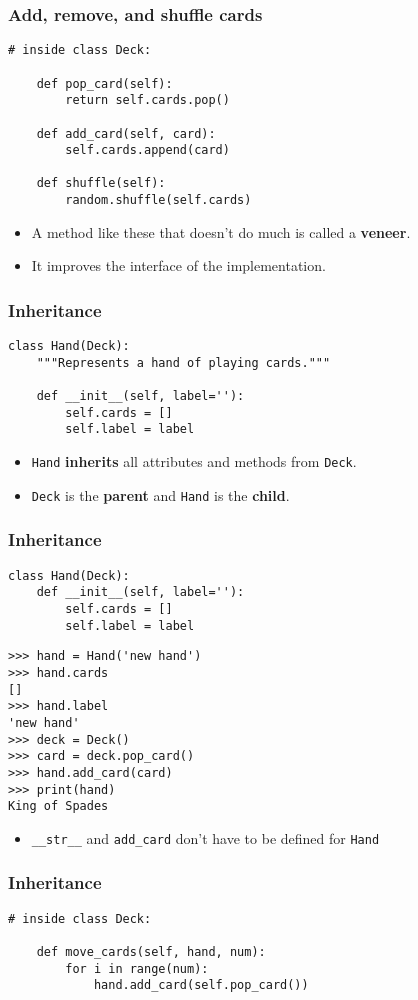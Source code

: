 \documentclass{beamer}
\newcommand{\bi}{\begin{itemize}}
\newcommand{\li}{\item}
\newcommand{\ei}{\end{itemize}}
\newcommand{\bfr}[1]{\begin{frame}[fragile]\frametitle{{ #1 }}}
\begin{document}
\bfr{Add, remove, and shuffle cards}
\begin{lstlisting}
# inside class Deck:

    def pop_card(self):
        return self.cards.pop()

    def add_card(self, card):
        self.cards.append(card)       
     
    def shuffle(self):
        random.shuffle(self.cards)
\end{lstlisting}

\bi
\li
A method like these that doesn't do much is called a {\bf veneer}.
\li
It improves the interface of the implementation.
\ei

\end{frame}

\bfr{Inheritance}
\begin{lstlisting}
class Hand(Deck):
    """Represents a hand of playing cards."""

    def __init__(self, label=''):
        self.cards = []
        self.label = label
\end{lstlisting}

\bi
\li
\lstinline{Hand} {\bf inherits} all attributes and methods from \lstinline{Deck}.
\li
\lstinline{Deck} is the {\bf parent} and \lstinline{Hand} is the {\bf child}.

\ei

\end{frame}
\bfr{Inheritance}
\begin{lstlisting}
class Hand(Deck):
    def __init__(self, label=''):
        self.cards = []
        self.label = label
\end{lstlisting}
\begin{lstlisting}
>>> hand = Hand('new hand')
>>> hand.cards
[]
>>> hand.label
'new hand'
>>> deck = Deck()
>>> card = deck.pop_card()
>>> hand.add_card(card)
>>> print(hand)
King of Spades
\end{lstlisting}
\bi
\li \lstinline{__str__} and \lstinline{add_card} don't have to be defined
for \lstinline{Hand}
\ei


\end{frame}



\bfr{Inheritance}
\begin{lstlisting}
# inside class Deck:

    def move_cards(self, hand, num):
        for i in range(num):
            hand.add_card(self.pop_card())
\end{lstlisting}
\end{frame}
\end{document}
